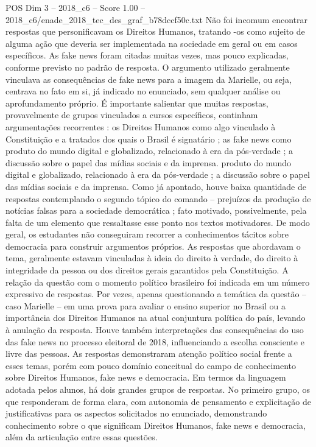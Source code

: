 \begin{textsample}{POS Dim 3 – 2018\_c6 – Score 1.00 – 2018\_c6/enade\_2018\_tec\_des\_graf\_b78dccf50c.txt}
Não foi incomum encontrar respostas que personificavam os Direitos Humanos, tratando -os como sujeito de alguma ação que deveria ser implementada na sociedade em geral ou em casos específicos.
As fake news foram citadas muitas vezes, mas pouco explicadas, conforme previsto no padrão de resposta.
O argumento utilizado geralmente vinculava as consequências de fake news para a imagem da Marielle, ou seja, centrava no fato em si, já indicado no enunciado, sem qualquer análise ou aprofundamento próprio.
É importante salientar que muitas respostas, provavelmente de grupos vinculados a cursos específicos, continham argumentações recorrentes : os Direitos Humanos como algo vinculado à Constituição e a tratados dos quais o Brasil é signatário ; as fake news como produto do mundo digital e globalizado, relacionado à era da pós-verdade ; a discussão sobre o papel das mídias sociais e da imprensa. produto do mundo digital e globalizado, relacionado à era da pós-verdade ; a discussão sobre o papel das mídias sociais e da imprensa.
Como já apontado, houve baixa quantidade de respostas contemplando o segundo tópico do comando – prejuízos da produção de notícias falsas para a sociedade democrática ; fato motivado, possivelmente, pela falta de um elemento que ressaltasse esse ponto nos textos motivadores.
De modo geral, os estudantes não conseguiram recorrer a conhecimentos tácitos sobre democracia para construir argumentos próprios.
As respostas que abordavam o tema, geralmente estavam vinculadas à ideia do direito à verdade, do direito à integridade da pessoa ou dos direitos gerais garantidos pela Constituição.
A relação da questão com o momento político brasileiro foi indicada em um número expressivo de respostas.
Por vezes, apenas questionando a temática da questão – caso Marielle – em uma prova para avaliar o ensino superior no Brasil ou a importância dos Direitos Humanos na atual conjuntura política do país, levando à anulação da resposta.
Houve também interpretações das consequências do uso das fake news no processo eleitoral de 2018, influenciando a escolha consciente e livre das pessoas.
As respostas demonstraram atenção político social frente a esses temas, porém com pouco domínio conceitual do campo de conhecimento sobre Direitos Humanos, fake news e democracia.
Em termos da linguagem adotada pelos alunos, há dois grandes grupos de respostas.
No primeiro grupo, os que responderam de forma clara, com autonomia de pensamento e explicitação de justificativas para os aspectos solicitados no enunciado, demonstrando conhecimento sobre o que significam Direitos Humanos, fake news e democracia, além da articulação entre essas questões.

\end{textsample}
